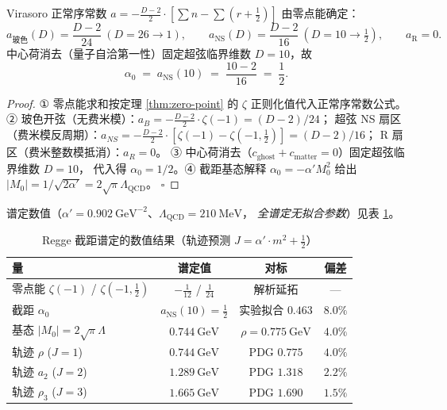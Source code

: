 \begin{theorem}[正常序常数与谱定截距]
\label{thm:regge-intercept}
Virasoro 正常序常数 $a = -\tfrac{D-2}{2}\cdot[\sum n - \sum(r+\tfrac{1}{2})]$
由零点能确定：
\begin{equation}
a_{\text{玻色}}(D) = \frac{D-2}{24}\ (D=26 \to 1), \qquad
a_{\text{NS}}(D) = \frac{D-2}{16}\ (D=10 \to \tfrac{1}{2}), \qquad
a_{\text{R}} = 0.
\end{equation}
中心荷消去（量子自洽第一性）固定超弦临界维数 $D = 10$，故
\begin{equation}
\boxed{\;\alpha_0 \;=\; a_{\text{NS}}(10) \;=\; \frac{10-2}{16} \;=\; \frac{1}{2}.\;}
\end{equation}
\end{theorem}

\begin{proof}
① 零点能求和按定理 \ref{thm:zero-point} 的 $\zeta$ 正则化值代入正常序常数公式。
② 玻色开弦（无费米模）：$a_B = -\tfrac{D-2}{2}\cdot\zeta(-1) = (D-2)/24$；
超弦 NS 扇区（费米模反周期）：$a_{NS} = -\tfrac{D-2}{2}\cdot[\zeta(-1) - \zeta(-1,\tfrac{1}{2})] = (D-2)/16$；
R 扇区（费米整数模抵消）：$a_R = 0$。
③ 中心荷消去（$c_{\text{ghost}} + c_{\text{matter}} = 0$）固定超弦临界维数 $D = 10$，
代入得 $\alpha_0 = 1/2$。④ 截距基态解释 $\alpha_0 = -\alpha'M_0^2$
给出 $|M_0| = 1/\sqrt{2\alpha'} = 2\sqrt{\pi}\Lambda_{\mathrm{QCD}}$。
$\square$
\end{proof}

谱定数值（$\alpha' = 0.902\ \mathrm{GeV}^{-2}$、$\Lambda_{\mathrm{QCD}} = 210\ \mathrm{MeV}$，
\emph{全谱定无拟合参数}）见表 \ref{tab:regge-intercept}。

\begin{table}[htbp]
\centering
\caption{Regge 截距谱定的数值结果（轨迹预测 $J = \alpha'\cdot m^2 + \tfrac{1}{2}$）}
\label{tab:regge-intercept}
\begin{tabular}{lccc}
\hline
量 & 谱定值 & 对标 & 偏差 \\
\hline
零点能 $\zeta(-1)$ / $\zeta(-1,\frac{1}{2})$ & $-\frac{1}{12}$ / $\frac{1}{24}$ & 解析延拓 & --- \\
截距 $\alpha_0$ & $a_{\mathrm{NS}}(10) = \frac{1}{2}$ & 实验拟合 $0.463$ & $8.0\%$ \\
基态 $|M_0| = 2\sqrt{\pi}\Lambda$ & $0.744\ \mathrm{GeV}$ & $\rho = 0.775\ \mathrm{GeV}$ & $4.0\%$ \\
轨迹 $\rho$ ($J=1$) & $0.744\ \mathrm{GeV}$ & PDG $0.775$ & $4.0\%$ \\
轨迹 $a_2$ ($J=2$) & $1.289\ \mathrm{GeV}$ & PDG $1.318$ & $2.2\%$ \\
轨迹 $\rho_3$ ($J=3$) & $1.665\ \mathrm{GeV}$ & PDG $1.690$ & $1.5\%$ \\
\hline
\end{tabular}
\end{table}

